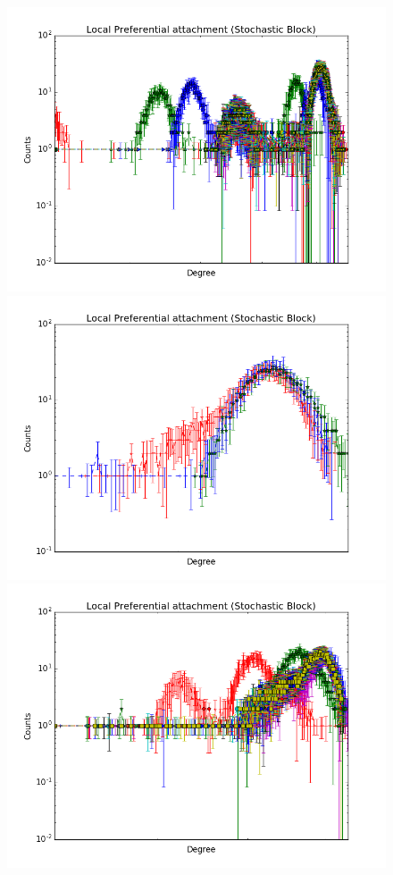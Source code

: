 \begin{figure}[ht]
	\endminipage
		\vspace{-0.29cm}
	\includegraphics[scale=0.27]{img/ilfm/1/figure_3}
	\endminipage
	\includegraphics[scale=0.27]{img/ilfm/2/figure_3} 
	\endminipage
	\includegraphics[scale=0.27]{img/ilfm/3/figure_3}

\end{figure}
